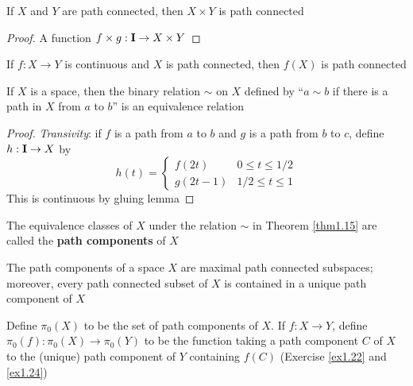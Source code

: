 \documentclass[11pt]{article}
\begin{document}
\begin{exercise}
\label{ex1.21}
If \(X\) and \(Y\) are path connected, then \(X\times Y\) is path connected
\end{exercise}

\begin{proof}
A function \(f\times g:\operatorname{\textbf{I}}\to X\times Y\)
\end{proof}

\begin{exercise}
\label{ex1.22}
If \(f:X\to Y\) is continuous and \(X\) is path connected, then \(f(X)\) is path connected
\end{exercise}

\begin{theorem}[]
\label{thm1.15}
If \(X\) is a space, then the binary relation \(\sim\) on \(X\) defined by ``\(a\sim b\) if there is a
path in \(X\) from \(a\) to \(b\)''  is an equivalence relation
\end{theorem}

\begin{proof}
\emph{Transivity}: if \(f\) is a path from \(a\) to \(b\) and \(g\) is a path from \(b\) to \(c\),
define \(h:\operatorname{\textbf{I}}\to X\) by
\begin{equation*}
h(t)=\begin{cases}
f(2t)&0\le t\le 1/2\\
g(2t-1)&1/2\le t\le 1
     \end{cases}
\end{equation*}
This is continuous by gluing lemma
\end{proof}

\begin{definition}[]
The equivalence classes of \(X\) under the relation \(\sim\) in Theorem \ref{thm1.15} are called the
\textbf{path components} of \(X\)
\end{definition}

\begin{exercise}
\label{ex1.24}
The path components of a space \(X\) are maximal path connected subspaces; moreover, every path
connected subset of \(X\) is contained in a unique path component of \(X\)
\end{exercise}

\begin{definition}[]
Define \(\pi_0(X)\) to be the set of path components of \(X\). If \(f:X\to Y\),
define \(\pi_0(f):\pi_0(X)\to\pi_0(Y)\) to be the function taking a path component \(C\) of \(X\) to the
(unique) path component of \(Y\) containing \(f(C)\) (Exercise \ref{ex1.22} and \ref{ex1.24})
\end{definition}
\end{document}
